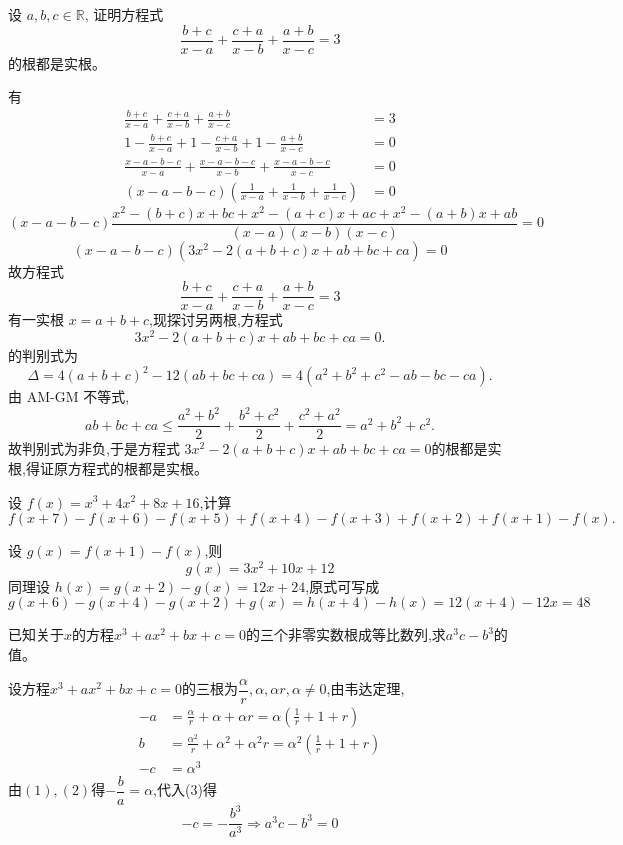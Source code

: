 \begin{questions}
    \question 设 $a, b, c \in \mathbb{R}$, 证明方程式
    \[
    \frac{b+c}{x-a}+\frac{c+a}{x-b}+\frac{a+b}{x-c}=3
    \]
    的根都是实根。
    \begin{solution}
        有
        \begin{align*}
        \frac{b+c}{x-a} + \frac{c+a}{x-b} + \frac{a+b}{x-c} &= 3 \\
        1 - \frac{b+c}{x-a} + 1 - \frac{c+a}{x-b} + 1 - \frac{a+b}{x-c} &= 0 \\
        \frac{x-a-b-c}{x-a} + \frac{x-a-b-c}{x-b} + \frac{x-a-b-c}{x-c} &= 0 \\
        (x-a-b-c)\left( \frac{1}{x-a} + \frac{1}{x-b} + \frac{1}{x-c} \right) &= 0
        \end{align*}
        \[
        (x-a-b-c) \frac{ x^2 - (b+c)x + bc + x^2 - (a+c)x + ac + x^2 - (a+b)x + ab }{ (x-a)(x-b)(x-c) } = 0 
        \]
        \[
        (x-a-b-c)\left( 3x^2 - 2(a+b+c)x + ab + bc + ca \right) = 0
        \]
        故方程式
        \[
        \frac{b+c}{x-a} + \frac{c+a}{x-b} + \frac{a+b}{x-c} = 3
        \]
        有一实根 $x = a + b + c$,现探讨另两根,方程式
        \[
        3x^2 - 2(a+b+c)x + ab + bc + ca = 0.
        \]
        的判别式为
        \[
        \Delta = 4(a+b+c)^2 - 12(ab+bc+ca) = 4\left(a^2 + b^2 + c^2 - ab - bc - ca\right).
        \]
        由 AM-GM 不等式,
        \[
        ab + bc + ca \leq \frac{a^2 + b^2}{2} + \frac{b^2 + c^2}{2} + \frac{c^2 + a^2}{2} = a^2 + b^2 + c^2.
        \]
        故判别式为非负,于是方程式 $3x^2 - 2(a+b+c)x + ab + bc + ca = 0$的根都是实根,得证原方程式的根都是实根。
    \end{solution}

    \question 设 $f(x)=x^3+4x^2+8x+16$,计算
    \[
    f(x+7)-f(x+6)-f(x+5)+f(x+4)-f(x+3)+f(x+2)+f(x+1)-f(x).
    \]
    \begin{solution}
        设 $g(x)=f(x+1)-f(x)$,则 
        \[
        g(x)=3x^2+10x+12 
        \]
        同理设 $h(x)=g(x+2)-g(x)=12x+24$,原式可写成
        \[
        g(x+6)-g(x+4)-g(x+2)+g(x)=h(x+4)-h(x)=12(x+4)-12x=48
        \]
    \end{solution}

    \question 已知关于$x$的方程$x^3+ax^2+bx+c=0$的三个非零实数根成等比数列,求$a^3c-b^3$的值。
    \begin{solution}
        设方程$x^3+ax^2+bx+c=0$的三根为$\dfrac{\alpha}{r},\alpha,\alpha r,\alpha \ne 0 $,由韦达定理,
        \begin{align*}
            -a&=\frac{\alpha}{r}+\alpha+\alpha r=\alpha(\frac{1}{r}+1+r) \tag{1}\\
            b&=\frac{\alpha^2}{r}+\alpha^2+\alpha^2 r=\alpha^2(\frac{1}{r}+1+r) \tag{2}\\
            -c&=\alpha^3 \tag{3}
        \end{align*}
        由$(1),(2)$得$-\dfrac{b}{a}=\alpha$,代入(3)得
        \[
        -c=-\frac{b^3}{a^3} \Rightarrow a^3c-b^3=0
        \]
    \end{solution}


\end{questions}
